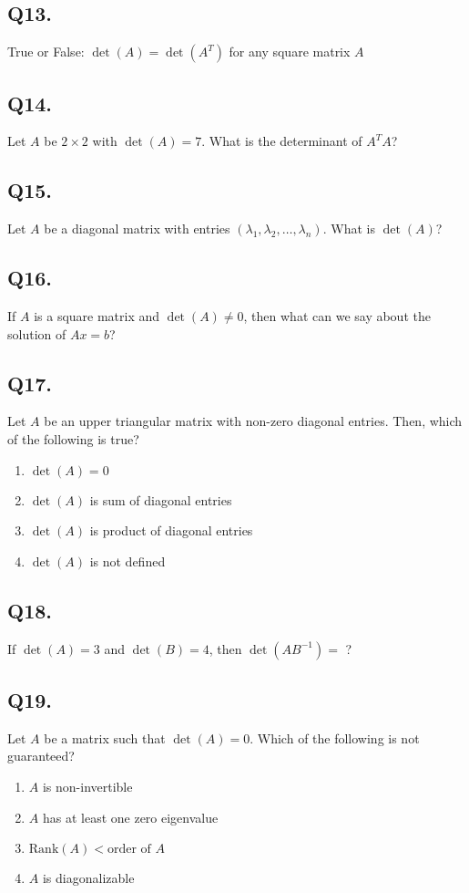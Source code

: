 \subsection*{Q13.}
True or False: $\det(A) = \det(A^T)$ for any square matrix $A$

\subsection*{Q14.}
Let $A$ be $2 \times 2$ with $\det(A) = 7$. What is the determinant of $A^T A$?

\subsection*{Q15.}
Let $A$ be a diagonal matrix with entries $(\lambda_1, \lambda_2, \dots, \lambda_n)$. What is $\det(A)$?

\subsection*{Q16.}
If $A$ is a square matrix and $\det(A) \neq 0$, then what can we say about the solution of $Ax = b$?

\subsection*{Q17.}
Let $A$ be an upper triangular matrix with non-zero diagonal entries. Then, which of the following is true?
\begin{enumerate}[label=(\alph*)]
    \item $\det(A) = 0$
    \item $\det(A)$ is sum of diagonal entries
    \item $\det(A)$ is product of diagonal entries
    \item $\det(A)$ is not defined
\end{enumerate}

\subsection*{Q18.}
If $\det(A) = 3$ and $\det(B) = 4$, then $\det(AB^{-1}) = $ ?

\subsection*{Q19.}
Let $A$ be a matrix such that $\det(A) = 0$. Which of the following is not guaranteed?
\begin{enumerate}[label=(\alph*)]
    \item $A$ is non-invertible
    \item $A$ has at least one zero eigenvalue
    \item $\text{Rank}(A) < \text{order of } A$
    \item $A$ is diagonalizable
\end{enumerate}


